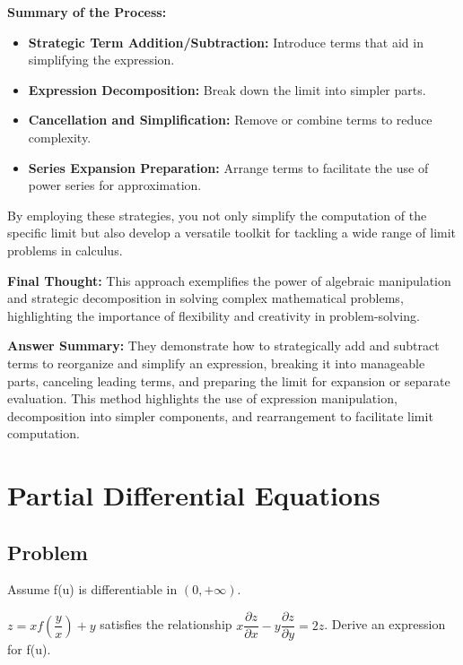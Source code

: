 \documentclass[a4paper,12pt]{book}
\begin{document}
\textbf{Summary of the Process:}
\begin{itemize}
\item 
\textbf{Strategic Term Addition/Subtraction:} Introduce terms that aid in simplifying the expression.

\item 
\textbf{Expression Decomposition:} Break down the limit into simpler parts.

\item 
\textbf{Cancellation and Simplification:} Remove or combine terms to reduce complexity.

\item 
\textbf{Series Expansion Preparation:} Arrange terms to facilitate the use of power series for approximation.

\end{itemize}

By employing these strategies, you not only simplify the computation of the specific limit but also develop a versatile toolkit for tackling a wide range of limit problems in calculus.

\textbf{Final Thought:} This approach exemplifies the power of algebraic manipulation and strategic decomposition in solving complex mathematical problems, highlighting the importance of flexibility and creativity in problem-solving.

\textbf{Answer Summary:}
They demonstrate how to strategically add and subtract terms to reorganize and simplify an expression, breaking it into manageable parts, canceling leading terms, and preparing the limit for expansion or separate evaluation. This method highlights the use of expression manipulation, decomposition into simpler components, and rearrangement to facilitate limit computation.

\chapter{Partial Differential Equations}

\section{Problem}

\begin{pbox}
Assume f(u) is differentiable in \((0,+\infty)\).

\( z=xf(\dfrac{y}{x})+y \) satisfies the relationship \( x \dfrac{\partial z}{\partial x} - y\dfrac{\partial z}{\partial y} = 2z \). Derive an expression for f(u).
\end{pbox}
\end{document}

